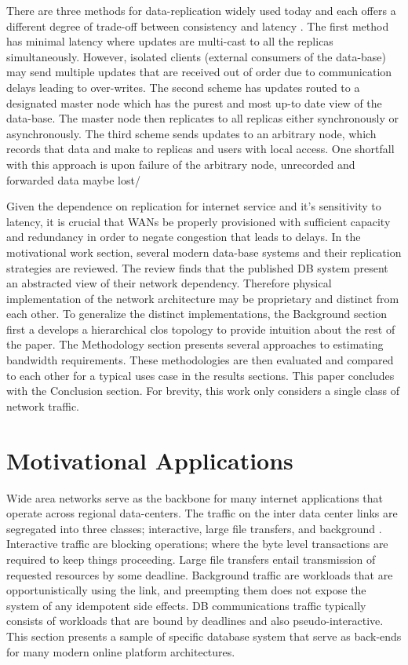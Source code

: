 \documentclass[conference]{IEEEtran}
\begin{document}
There are three methods for data-replication widely used today and each offers a different degree of trade-off between consistency and latency \cite{Abadi}. The first method has minimal latency where updates are multi-cast to all the replicas simultaneously. However, isolated clients (external consumers of the data-base) may send multiple updates that are received out of order due to communication delays leading to over-writes. The second scheme has updates routed to a designated master node which has the purest and most up-to date view of the data-base. The master node then replicates to all replicas either synchronously or asynchronously. The third scheme sends updates to an arbitrary node, which records that data and make to replicas and users with local access. One shortfall with this approach is upon failure of the arbitrary node, unrecorded and forwarded data maybe lost/

Given the dependence on replication for internet service and it's sensitivity to latency, it is crucial that WANs be properly provisioned with sufficient capacity and redundancy in order to negate congestion that leads to delays. In the motivational work section, several modern data-base systems and their replication strategies are reviewed. The review finds that the published DB system present an abstracted view of their network dependency. Therefore physical implementation of the network architecture may be proprietary and distinct from each other. To generalize the distinct implementations, the Background section first a develops a hierarchical clos topology to provide intuition about the rest of the paper. The Methodology section presents several approaches to estimating bandwidth requirements. These methodologies are then evaluated and compared to each other for a typical uses case in the results sections. This paper concludes with the Conclusion section. For brevity, this work only considers a single class of network traffic. 

\section{Motivational Applications}

Wide area networks serve as the backbone for many internet applications that operate across regional data-centers. The traffic on the inter data center links are segregated into three classes; interactive, large file transfers, and background \cite{Zhang}. Interactive traffic are blocking operations; where the byte level transactions are required to keep things proceeding. Large file transfers entail transmission of requested resources by some deadline. Background traffic are workloads that are opportunistically using the link, and preempting them does not expose the system of any idempotent side effects. DB communications traffic typically consists of workloads that are bound by deadlines and also pseudo-interactive. This section presents a sample of specific database system that serve as back-ends for many modern online platform architectures. 
\end{document}
